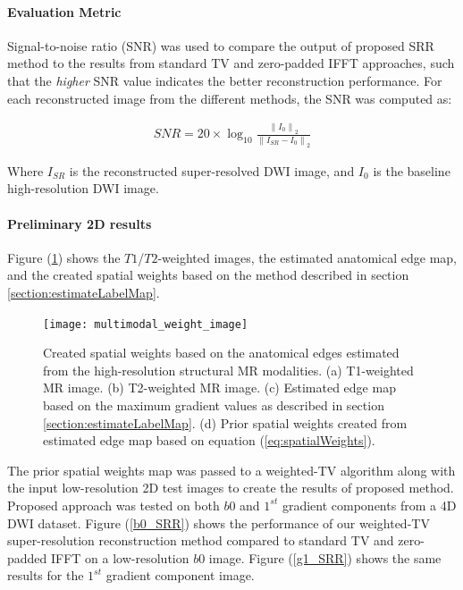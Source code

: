 \paragraph{Evaluation Metric}

Signal-to-noise ratio (SNR) was used to compare the output of proposed SRR method to the results from standard TV and zero-padded IFFT approaches, such that the \textit{higher} SNR value indicates the better reconstruction performance.
For each reconstructed image from the different methods, the SNR was computed as:

\begin{equation}
\label{eq:snr}
\begin{gathered}
SNR = 20\times \log_{10} \frac{\left \| I_0 \right \|_{2}}{\left \| I_{SR} - I_0 \right \|_{2}}
\end{gathered}
\end{equation}

Where $I_{SR}$ is the reconstructed super-resolved DWI image, and $I_0$ is the baseline high-resolution DWI image.

\paragraph{Preliminary 2D results}
Figure (\ref{multimodal_wight_image}) shows the $T1$/$T2$-weighted images, the estimated anatomical edge map, and the created spatial weights based on the method described in section \ref{section:estimateLabelMap}.

\begin{figure}
\centering
\texttt{[image: multimodal\_weight\_image]}\
\centering
\caption{Created spatial weights based on the anatomical edges estimated from the high-resolution structural MR modalities. (a) T1-weighted MR image. (b) T2-weighted MR image. (c) Estimated edge map based on the maximum gradient values as described in section \ref{section:estimateLabelMap}. (d) Prior spatial weights created from estimated edge map based on equation (\ref{eq:spatialWeights}).}
\label{multimodal_wight_image}
\end{figure}

The prior spatial weights map was passed to a weighted-TV algorithm along with the input low-resolution 2D test images to create the results of proposed method.
Proposed approach was tested on both $b0$ and $1^{st}$ gradient components from a 4D DWI dataset.
Figure (\ref{b0_SRR}) shows the performance of our weighted-TV super-resolution reconstruction method compared to standard TV and zero-padded IFFT on a low-resolution $b0$ image.
Figure (\ref{g1_SRR}) shows the same results for the $1^{st}$ gradient component image.

